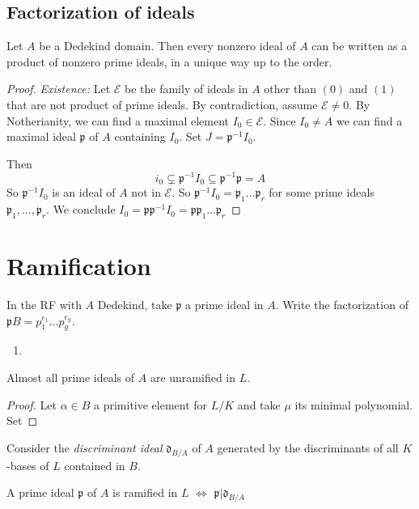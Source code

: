 \subsection{Factorization of ideals}
\begin{theorem}{}
    Let \(A\) be a Dedekind domain. Then every nonzero ideal of \(A\) can be
    written as a product of nonzero prime ideals, in a unique way up to the
    order.
\end{theorem}
\begin{proof}{}
    \emph{Existence:} Let \(\mathcal{E}\) be the family of ideals in \(A\) other
    than \({(0)}\) and \({(1)}\) that are not product of prime ideals. By
    contradiction, assume \(\mathcal{E} \neq 0\). By Notherianity, we can find a
    maximal element \(I_{0} \in \mathcal{E}\). Since \(I_{0} \neq A\) we can
    find a maximal ideal \(\mathfrak{p}\) of \(A\) containing \(I_{0}\). Set \(J
    = \mathfrak{p}^{-1} I_{0}\).

    Then
    \[
      i_{0} \subsetneq \mathfrak{p}^{-1}I_{0} \subseteq \mathfrak{p}^{-1}
      \mathfrak{p} = A 
    \]
    So \(\mathfrak{p}^{-1}I_{0}\) is an ideal of \(A\) not in \(\mathcal{E}\).
    So \(\mathfrak{p}^{-1} I_{0} = \mathfrak{p}_1 \dots \mathfrak{p}_r\) for
    some prime ideals \(\mathfrak{p}_1, \dots, \mathfrak{p}_r\). We conclude
    \(I_{0} = \mathfrak{p} \mathfrak{p}^{-1} I_{0} = \mathfrak{p} \mathfrak{p}_1
    \dots \mathfrak{p}_r\) 

\end{proof}



\section{Ramification}

\begin{definition}{}
    In the RF with \(A\) Dedekind, take \(\mathfrak{p}\) a prime ideal in \(A\).
    Write the factorization of \(\mathfrak{p}B = p_{1}^{e_{1}} \dots p_g
    ^{e_g}\).
\begin{enumerate}[label = \arabic*.]
    \item 
\end{enumerate}

\end{definition}


\begin{proposition}{}
    Almost all prime ideals of \(A\) are unramified in \(L\).  
\end{proposition}
\begin{proof}{}
    Let \(\alpha \in
    B\) a primitive element for \(L / K\) and take \(\mu\) its minimal
    polynomial. Set
\end{proof}

\begin{theorem}{}
    Consider the \emph{discriminant ideal} \(\mathfrak{d}_{B / A} \) of \(A\)
    generated by the discriminants of all \(K\)-bases of \(L\) contained in
    \(B\).

    A prime ideal \(\mathfrak{p}\) of \(A\) is ramified in \(L\) \(\iff\)
    \(\mathfrak{p} | \mathfrak{d}_{B / A} \) 
\end{theorem}



